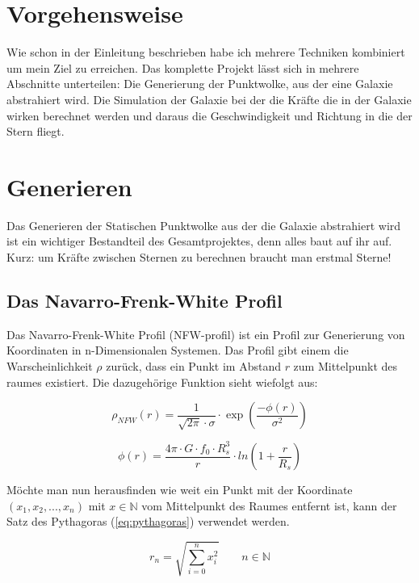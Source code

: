 \documentclass[a4paper, 10pt]{article}
\begin{document}
\begin{multicols*}{2}
\section{Vorgehensweise}

Wie schon in der Einleitung beschrieben habe ich mehrere Techniken kombiniert
um mein Ziel zu erreichen. Das komplette Projekt lässt sich in mehrere
Abschnitte unterteilen: Die Generierung der Punktwolke, aus der eine Galaxie
abstrahiert wird.  Die Simulation der Galaxie bei der die Kräfte die in der
Galaxie wirken berechnet werden und daraus die Geschwindigkeit und Richtung in
die der Stern fliegt.

\section{Generieren}

Das Generieren der Statischen Punktwolke aus der die Galaxie abstrahiert wird
ist ein wichtiger Bestandteil des Gesamtprojektes, denn alles baut auf ihr auf.
Kurz: um Kräfte zwischen Sternen zu berechnen braucht man erstmal Sterne!

\subsection{Das Navarro-Frenk-White Profil}
Das Navarro-Frenk-White Profil (NFW-profil) ist ein Profil zur Generierung von
Koordinaten in n-Dimensionalen Systemen. Das Profil gibt einem die
Warscheinlichkeit \( \rho \) zurück, dass ein Punkt im Abstand \( r \) zum
Mittelpunkt des raumes existiert.  Die dazugehörige Funktion sieht wiefolgt
aus:

\begin{equation} \label{eq:NFW_profile}
  \rho_{NFW}(r) = \frac{ 1 }{ \sqrt{ 2 \pi } \cdot \sigma } \cdot
  \exp \left( \frac{ -\phi(r) }{ \sigma^{ 2 } } \right)
\end{equation}

\begin{equation*}
  \phi(r) = \frac{ 4\pi \cdot G \cdot f_{0} \cdot R_{s}^3 }{ r } \cdot
  ln{ \left( 1 + \frac{ r }{ R_{s} } \right) }
\end{equation*}

Möchte man nun herausfinden wie weit ein Punkt mit der Koordinate \( (x_1, x_2,
... , x_n) \) mit \( x \in \mathbb{N} \) vom Mittelpunkt des Raumes entfernt
ist, kann der Satz des Pythagoras (\ref{eq:pythagoras}) verwendet werden.

\begin{equation} \label{eq:pythagoras}
r_n = \sqrt{\sum_{i=0}^{n} x_i^2} \qquad n \in \mathbb{N}
\end{equation}


\end{multicols*}
\end{document}
